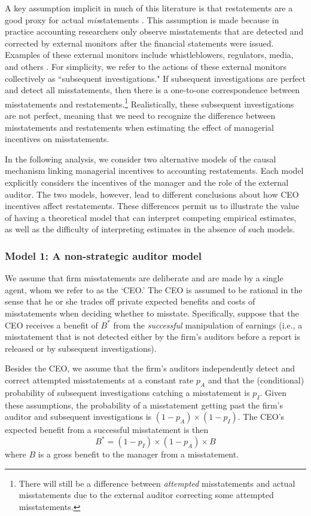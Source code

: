 \documentclass[12pt,reqno,titlepage]{amsart}
\theoremstyle{definition}
\begin{document}
\begin{doublespace}
A key assumption implicit in much of this literature is that restatements are a good proxy for actual \emph{mis}statements \citep[e.g.,][]{Efendi:2007ja,Armstrong:2010jd}. 
This assumption is made because in practice accounting researchers only observe misstatements that are detected and corrected by external monitors after the financial statements were issued. 
Examples of these external monitors include whistleblowers, regulators, media, and others \citep[e.g.,][]{Dyck:2010kh}.  
For simplicity,  we refer to the actions of these external monitors collectively as ``subsequent investigations."
If subsequent investigations are perfect and detect all misstatements, then there is a one-to-one correspondence between misstatements and restatements.\footnote{There will still be a difference between \emph{attempted} misstatements and actual misstatements due to the external auditor correcting some attempted misstatements.}
Realistically, these subsequent investigations are not perfect, meaning that we need to recognize the difference between misstatements and restatements when estimating the effect of managerial incentives on misstatements.  

In the following analysis, we consider two alternative models of the causal mechanism linking managerial incentives to accounting restatements.
Each model explicitly considers the incentives of the manager and the role of the external auditor. 
The two models, however, lead to different conclusions about how CEO incentives affect
restatements. 
These differences permit us to illustrate the value of having a theoretical model that can interpret competing empirical estimates, as well as the difficulty of interpreting estimates in the absence of such models.

\subsubsection{Model 1: A non-strategic auditor model}
We assume that firm misstatements are deliberate and are made by a single agent, whom we refer 
to as the `CEO.' 
The CEO is assumed to be rational in the sense that he or she trades off private expected benefits and costs of misstatements when deciding whether to misstate.
Specifically, suppose that the CEO receives a benefit of $B^*$ from the \emph{successful} manipulation of earnings (i.e., a misstatement that is not detected either by the firm's auditors before a report is released or by subsequent investigations). 

Besides the CEO, we assume that the firm's auditors independently detect and correct attempted misstatements at a constant rate $p_A$ and that the (conditional) probability of subsequent investigations catching a misstatement is $p_I$.
Given these assumptions, the probability of a misstatement getting past the firm's  auditor and subsequent investigations is $(1-p_A) \times (1 - p_I)$.
The CEO's expected benefit from a successful misstatement is then
$$ B^* = (1-p_I) \times (1-p_A) \times B$$
where $B$ is a gross benefit to the manager from a misstatement. 


\end{doublespace}
\end{document}
